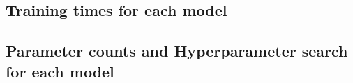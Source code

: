 \subsection{Training times for each model}


\subsection{Parameter counts and Hyperparameter search for each model}


